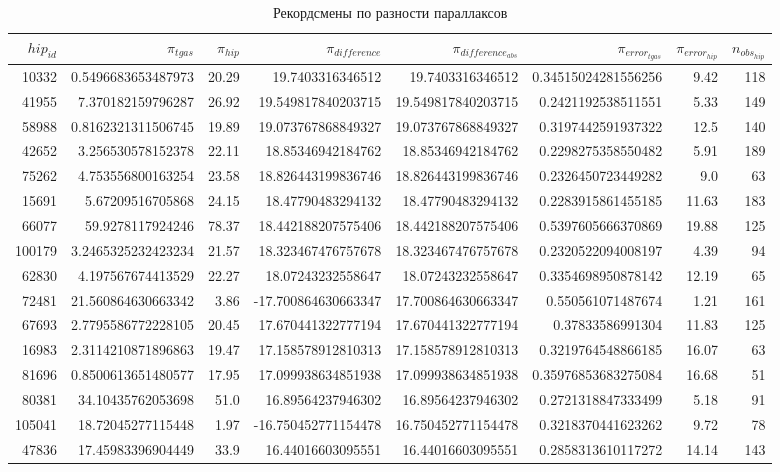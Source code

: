 \documentclass[14pt]{article} %
\begin{document}
\begin{landscape}
\begin{spacing}{1.0}
\begin{table}[h]
\caption{Рекордсмены по разности параллаксов}
\label{tabular:75_75}
\begin{tabular}{|r|r|r|r|r|r|r|r|}
\hline 	
$hip_{id}$ &$\pi_{tgas}$ &$\pi_{hip}$ &$\pi_{difference}$ &$\pi_{difference_{abs}}$ &$\pi_{error_{tgas}}$ &$\pi_{error_{hip}}$ &$n_{obs_{hip}}$\\
\hline 
10332&0.5496683653487973&20.29&19.7403316346512&19.7403316346512&0.34515024281556256&9.42&118\\
41955&7.370182159796287&26.92&19.549817840203715&19.549817840203715&0.2421192538511551&5.33&149\\
58988&0.8162321311506745&19.89&19.073767868849327&19.073767868849327&0.3197442591937322&12.5&140\\
42652&3.256530578152378&22.11&18.85346942184762&18.85346942184762&0.2298275358550482&5.91&189\\
75262&4.753556800163254&23.58&18.826443199836746&18.826443199836746&0.2326450723449282&9.0&63\\
15691&5.67209516705868&24.15&18.47790483294132&18.47790483294132&0.2283915861455185&11.63&183\\
66077&59.9278117924246&78.37&18.442188207575406&18.442188207575406&0.5397605666370869&19.88&125\\
100179&3.2465325232423234&21.57&18.323467476757678&18.323467476757678&0.2320522094008197&4.39&94\\
62830&4.197567674413529&22.27&18.07243232558647&18.07243232558647&0.3354698950878142&12.19&65\\
72481&21.560864630663342&3.86&-17.700864630663347&17.700864630663347&0.550561071487674&1.21&161\\
67693&2.7795586772228105&20.45&17.670441322777194&17.670441322777194&0.37833586991304&11.83&125\\
16983&2.3114210871896863&19.47&17.158578912810313&17.158578912810313&0.3219764548866185&16.07&63\\
81696&0.8500613651480577&17.95&17.099938634851938&17.099938634851938&0.35976853683275084&16.68&51\\
80381&34.10435762053698&51.0&16.89564237946302&16.89564237946302&0.2721318847333499&5.18&91\\
105041&18.72045277115448&1.97&-16.750452771154478&16.750452771154478&0.3218370441623262&9.72&78\\
47836&17.45983396904449&33.9&16.44016603095551&16.44016603095551&0.2858313610117272&14.14&143\\

\end{tabular}
\end{table}
\end{spacing}
\end{landscape}
\end{document}
